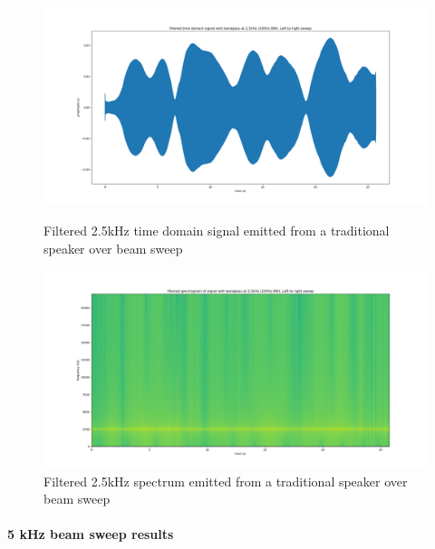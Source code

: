 \begin{figure}[ht!]
    \centering
    \begin{minipage}{0.49\textwidth}
        \centering
        \includegraphics[width=\textwidth]{Figures/Testing/BeamSweep/Classical_speaker/2_5k_amp_sweep_spkr.png}
        \caption{Filtered 2.5kHz time domain signal emitted from a traditional speaker over beam sweep}
        \label{fig:spkr_sweep25k_amp}
    \end{minipage}\hfill
    \begin{minipage}{0.49\textwidth}
        \centering
        \includegraphics[width=\textwidth]{Figures/Testing/BeamSweep/Classical_speaker/2_5k_freq_sweep_spkr.png}
        \caption{Filtered 2.5kHz spectrum emitted from a traditional speaker over beam sweep}
        \label{fig:spkr_sweep25k_spectro}
    \end{minipage}
\end{figure}



\paragraph{5 kHz beam sweep results}

